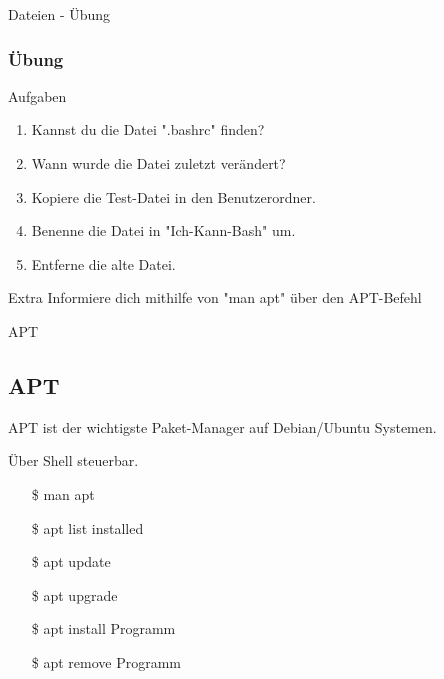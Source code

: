 \begin{frame}{Dateien - Übung}
    \subsubsection{Übung}\label{subsubsec:übung}

    \begin{alertblock}{Aufgaben}
        \begin{enumerate}\pause
            \item Kannst du die Datei ".bashrc" finden?\pause
            \item Wann wurde die Datei zuletzt verändert?\pause
            \item Kopiere die Test-Datei in den Benutzerordner.\pause
            \item Benenne die Datei in "Ich-Kann-Bash" um.\pause
            \item Entferne die alte Datei.
        \end{enumerate}
    \end{alertblock}
    \pause

    \vspace{0.5cm}
    \begin{alertblock}{Extra}
        Informiere dich mithilfe von "man apt" über den APT-Befehl
    \end{alertblock}

\end{frame}

\begin{frame}{APT}
    \subsection{APT}\label{subsec:apt}
    \pause
    APT ist der wichtigste Paket-Manager auf Debian/Ubuntu Systemen.
    \pause

    \textrightarrow Über Shell steuerbar.
    \pause

    \begin{itemize}
        \item[\$] man apt\pause
        \item[\$] apt list \textminus\textminus installed\pause
        \item[\$] apt update\pause
        \item[\$] apt upgrade\pause
        \item[\$] apt install Programm\pause
        \item[\$] apt remove Programm
    \end{itemize}

\end{frame}

